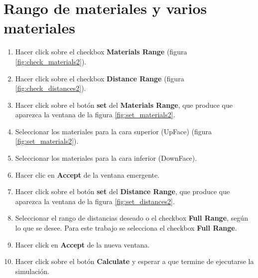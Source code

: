 \section{Rango de materiales y varios materiales}
\begin{enumerate}
			\item Hacer click sobre el checkbox \textbf{Materials Range} (figura \ref{fig:check_materials2}).
			\item Hacer click sobre el checkbox \textbf{Distance Range} (figura \ref{fig:check_distances2}).
			\item Hacer click sobre el botón \textbf{set} del \textbf{Materials Range}, que produce que aparezca la ventana de la figura \ref{fig:set_materials2}.
			\item Seleccionar los materiales para la cara superior (UpFace) (figura \ref{fig:set_materials2}).
			\item Seleccionar los materiales para la cara inferior (DownFace).
			\item Hacer clic en \textbf{Accept} de la ventana emergente.
			\item Hacer click sobre el botón \textbf{set} del \textbf{Distance Range}, que produce que aparezca la ventana de la figura \ref{fig:set_distances2}.
			\item Seleccionar el rango de distancias deseado o el checkbox \textbf{Full Range}, según lo que se desee. Para este trabajo se selecciona el checkbox \textbf{Full Range}.
			\item Hacer click en \textbf{Accept} de la nueva ventana.
			\item Hacer click sobre el botón \textbf{Calculate} y esperar a que termine de ejecutarse la simulación.
\end{enumerate}